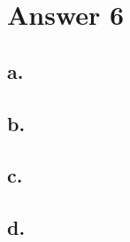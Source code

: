 \documentclass[12pt]{article}
\begin{document}
\section*{Answer 6}

\subsection*{a.}

\subsection*{b.}

\subsection*{c.}

\subsection*{d.}


\end{document}
